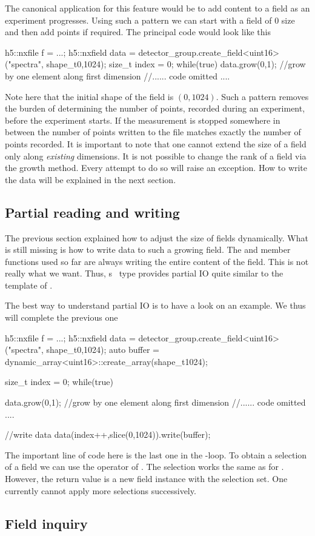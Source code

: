 The canonical application for this feature would be to add content to a field 
as an experiment progresses. Using such a pattern we can start with a field 
of $0$ size and then add points if required. The principal code would look like
this
\begin{cppcode}
h5::nxfile f = ...;
h5::nxfield data = detector_group.create_field<uint16>("spectra",
                                                       shape_t{0,1024});
size_t index = 0;
while(true)
{
    data.grow(0,1); //grow by one element along first dimension
    //...... code omitted ....
}
\end{cppcode}
Note here that the initial shape of the field is $(0,1024)$. Such a pattern 
removes the burden of determining the number of points, recorded during 
an experiment, before the experiment starts. If the measurement is stopped 
somewhere in between the number of points written to the file matches exactly
the number of points recorded.  
It is important to note that one cannot extend the size of a field only along
\emph{existing} dimensions. It is not possible to change the rank of a field via
the growth method. Every attempt to do so will raise an 
exception.
How to write the data will be explained in the next section.

\subsection{Partial reading and writing}

The previous section explained how to adjust the size of fields dynamically. 
What is still missing is how to write data to such a growing field. The 
 and  member functions used so far are always writing
the entire content of the field. This is not really what we want. 
Thus, \libpniio s \nxfield\ type provides partial IO quite similar to the 
 template of \libpnicore. 

The best way to understand partial IO is to have a look on an example. We thus
will complete the previous one 

\begin{cppcode}
h5::nxfile f = ...;
h5::nxfield data = detector_group.create_field<uint16>("spectra",
                                                       shape_t{0,1024});
auto buffer = dynamic_array<uint16>::create_array(shape_t{1024});

size_t index = 0;
while(true)
{
    data.grow(0,1); //grow by one element along first dimension
    //...... code omitted ....

    //write data
    data(index++,slice(0,1024)).write(buffer);
}
\end{cppcode}
The important line of code here is the last one in the -loop. To obtain
a selection of a field we can use the \cpp{()} operator of \nxfield. 
The selection works the same as for . However, the return value is 
a new field instance with the selection set. One currently cannot apply more
selections successively. 


\subsection{Field inquiry}
